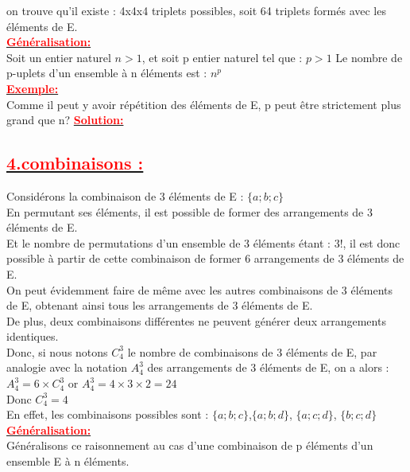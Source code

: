 \documentclass[12pt]{article}
\begin{document}
on trouve qu’il existe : 4x4x4 triplets possibles, soit 64 triplets formés avec les éléments de E.\\
\underline{\textbf{\textcolor{red}{Généralisation:}}}\\
Soit un entier naturel $n > 1$, et soit p entier naturel tel que : $p > 1$
Le nombre de p-uplets d’un ensemble à n éléments est : $n^{p}$\\
\underline{\textbf{\textcolor{red}{Exemple:}}}\\
Comme il peut y avoir répétition des éléments de E, p peut être strictement plus grand que n? 
\underline{\textbf{\textcolor{red}{Solution:}}}\\
\subsection*{\underline{\textbf{\textcolor{red}{4.combinaisons :}}}}
 Considérons la combinaison de 3 éléments de E : $\lbrace a ; b ; c \rbrace$\\
En permutant ses éléments, il est possible de former des arrangements de 3 éléments de E.\\

Et le nombre de permutations d’un ensemble de 3 éléments étant : 3!, il est donc possible à partir de cette combinaison de former 6 arrangements de 3 éléments de E.\\
On peut évidemment faire de même avec les autres combinaisons de 3 éléments de E, obtenant ainsi tous les arrangements de 3 éléments de E.\\

De plus, deux combinaisons différentes ne peuvent générer deux arrangements identiques.\\
Donc, si nous notons $C^{3}_{4}$ le nombre de combinaisons de 3 éléments de E, par analogie avec la notation $A^{3}_{4}$ des arrangements de 3 éléments de E, on a alors : $A^{3}_{4}=6 \times C^{3}_{4}$ or 
$A^{3}_{4}=4\times3\times2=24$\\ Donc $C^{3}_{4}=4$\\
En effet, les combinaisons possibles sont : $\lbrace a ; b ; c \rbrace$,$\lbrace a ; b ; d \rbrace$,
$\lbrace a ; c ; d \rbrace$, $\lbrace b ; c ; d \rbrace$\\
\underline{\textbf{\textcolor{red}{Généralisation:}}}\\
Généralisons ce raisonnement au cas d’une combinaison de p éléments
d’un ensemble E à n éléments.\\
\end{document}
